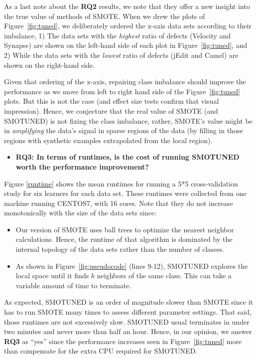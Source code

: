 \documentclass[sigconf,review, anonymous]{acmart}
\newcommand{\bi}{\begin{itemize}[leftmargin=0.4cm]}
\newcommand{\ei}{\end{itemize}}
\theoremstyle{break}
\theoremstyle{break}
\newcommand{\sma}{{\sc SMOTE}}
\newcommand{\smb}{{\sc SMOTUNED}}
\begin{document}
As a last note about the {\bf RQ2} results, we note that they offer a new insight into
the true value of methods of {\sma}.
When we drew the plots of  Figure~\ref{fig:tuned}, we deliberately ordered
the x-axis data sets according to their imbalance, 1) The data sets with the {\em highest} ratio of defects (Velocity and Synapse) are shown on the left-hand side of each plot in Figure~\ref{fig:tuned}, and 2) While the data sets with the {\em lowest} ratio of defects (jEdit and Camel) are shown on the right-hand side.

Given that ordering of the x-axis, repairing class imbalance should improve the performance as we move from left to right hand side of the  Figure~\ref{fig:tuned} plots.
But this is not the case (and effect size tests confirm that visual impression).
Hence, we conjecture that the   real value of {\sma} (and {\smb}) is not fixing the class imbalance, rather, SMOTE's
value might be in {\em amplifying} the data's signal in sparse regions of the data (by filling
in those regions with synthetic examples extrapolated from the local region). 

\bi
\item {\bf RQ3: In  terms  of  runtimes,  is  the  cost  of  running  {\smb} worth the performance improvement?}
\ei

Figure \ref{runtime} shows the mean runtimes
for running a 5*5 cross-validation study for six learners for each data set.
These runtimes were collected from one machine running CENTOS7, with 16 cores.
Note that they do not increase monotonically with the size of the data sets since:
\bi
\item Our version of {\sma} uses ball trees to optimize the nearest neighbor calculations. Hence, the runtime of that algorithm is dominated by the internal topology of the data sets rather than the number of classes.
\item
As shown in 
Figure~\ref{fig:pseudocode} (lines 9-12),
{\smb} explores the local space until it finds $k$ neighbors of the same class. This can take a variable amount of time to terminate.
\ei
As expected,  {\smb} is an order of magnitude slower than {\sma} since
it has to run {\sma} many times to assess different parameter settings.
That said, those runtimes are not excessively slow.
{\smb} usual terminates in under two minutes and never more than half an hour.
Hence, in  our opinion, we answer {\bf RQ3} as ``yes'' since the   performance increases
seen in Figure~\ref{fig:tuned} more than compensate for the extra CPU required for {\smb}.
\end{document}
